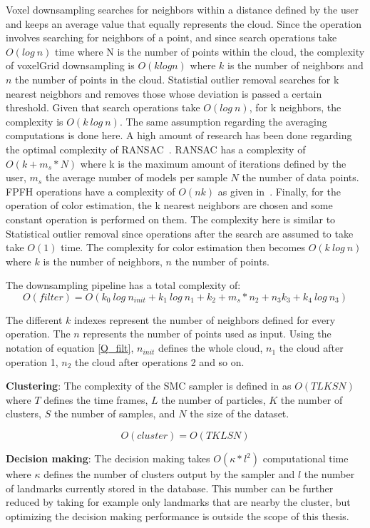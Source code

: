 \documentclass[twoside,hidelinks]{article}
\begin{document}
Voxel downsampling searches for neighbors within a distance defined by the user and keeps an average value that equally represents the cloud. Since the operation involves searching for neighbors of a point, and since search operations take $O(log\ n)$ time where N is the number of points within the cloud, the complexity of voxelGrid downsampling is $O(k log n)$ where $k$ is the number of neighbors and $n$ the number of points in the cloud. 
Statistial outlier removal searches for k nearest neigbhors and removes those whose deviation is passed a certain threshold. Given that search operations take $O(log\ n)$, for k neighbors, the complexity is $O(k\ log\ n)$. The same assumption regarding the averaging computations is done here.
A high amount of research has been done regarding the optimal complexity of RANSAC~\cite{RANSAC}. RANSAC has a complexity of $ O(k+ m_s*N)$ where k is the maximum amount of iterations defined by the user, $m_s$ the average number of models per sample $N$ the number of data points.
FPFH operations have a complexity of $O(nk)$ as given in~\cite{fpfh}.
Finally, for the operation of color estimation, the k nearest neighbors are chosen and some constant operation is performed on them. The complexity here is similar to Statistical outlier removal since operations after the search are assumed to take take $O(1)$ time. The complexity for color estimation then becomes $O(k\ log\ n)$ where $k$ is the number of neighbors, $n$ the number of points. 

The downsampling pipeline has a total complexity of:
\begin{equation} \label{Q_filt}
O(filter) = O(k_{0}\ log\ n_{init} + k_{1}\ log\ n_{1} + k_{2}+ m_s*n_{2} + n_{3}k_{3} + k_{4}\ log\ n_{3} )
\end{equation}

The different $k$ indexes represent the number of neighbors defined for every operation. The $n$ represents the number of points used as input. Using the notation of equation \ref{Q_filt}, $n_{init}$ defines the whole cloud, $n_1$ the cloud after operation 1, $n_2$ the cloud after operations 2 and so on.

\textbf{Clustering}: The complexity of the SMC sampler is defined in \cite{smcddp} as $O(TLKSN)$ where $T$ defines the time frames, $L$ the number of particles, $K$ the number of clusters, $S$ the number of samples, and $N$ the size of the dataset. 

$$
O(cluster) = O(TKLSN)
$$

\textbf{Decision making}: The decision making takes $ O(\kappa * l^2) $ computational time where $\kappa$ defines the number of clusters output by the sampler and $l$ the number of landmarks currently stored in the database. This number can be further reduced by taking for example only landmarks that are nearby the cluster, but optimizing the decision making performance is outside the scope of this thesis.
\end{document}

